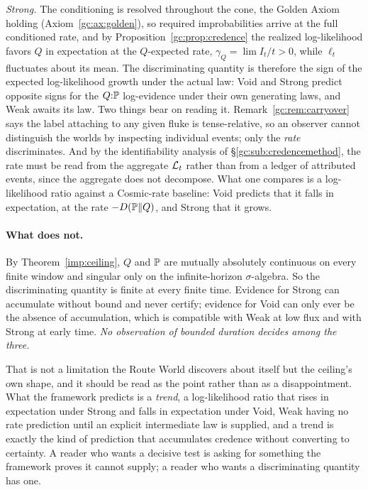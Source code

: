 \emph{Strong.} The conditioning is resolved throughout the cone, the
Golden Axiom holding (Axiom~\ref{gc:ax:golden}), so
required improbabilities arrive at the full conditioned rate, and by
Proposition~\ref{gc:prop:credence} the realized log-likelihood favors
$Q$ in expectation at the $Q$-expected rate, $\gamma_Q=\lim I_t/t>0$, while
$\ell_t$ fluctuates about its mean. The discriminating quantity is therefore the sign of the expected
log-likelihood growth under the actual law: Void and Strong predict
opposite signs for the $Q{:}\mathbb{P}$ log-evidence under their own
generating laws, and Weak awaits its law. Two things bear on reading it.
Remark~\ref{gc:rem:carryover} says the label attaching to any given fluke
is tense-relative, so an observer cannot distinguish the worlds by
inspecting individual events; only the \emph{rate} discriminates. And by
the identifiability analysis of \S\ref{gc:sub:credencemethod}, the rate
must be read from the aggregate $\mathcal{L}_t$ rather than from a ledger of
attributed events, since the aggregate does not decompose. What one
compares is a log-likelihood ratio against a Cosmic-rate baseline: Void
predicts that it falls in expectation, at the rate $-D(\mathbb{P}\|Q)$, and
Strong that it grows.

\paragraph{What does not.} By Theorem~\ref{imp:ceiling}, $Q$ and $\mathbb{P}$
are mutually absolutely continuous on every finite window and singular
only on the infinite-horizon $\sigma$-algebra. So the discriminating
quantity is finite at every finite time. Evidence for Strong can
accumulate without bound and never certify; evidence for Void can only
ever be the absence of accumulation, which is compatible with Weak at low
flux and with Strong at early time. \emph{No observation of bounded
duration decides among the three.}

That is not a limitation the Route World discovers about itself but the
ceiling's own shape, and it should be read as the point rather than as a
disappointment. What the framework predicts is a \emph{trend}, a
log-likelihood ratio that rises in expectation under Strong and falls in
expectation under Void, Weak having no rate prediction until an explicit
intermediate law is supplied, and a trend is exactly the kind of
prediction that accumulates credence without converting to certainty. A
reader who wants a decisive test is asking for something the framework
proves it cannot supply; a reader who wants a discriminating quantity has
one.

